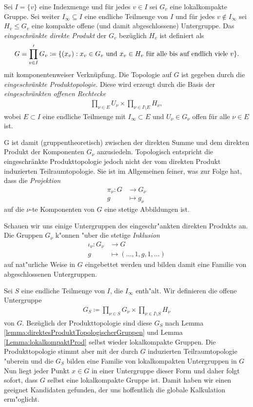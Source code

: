 		\begin{defi}
			Sei $I=\{v\}$ eine Indexmenge und für jedes $v \in I$ sei $G_v$ eine lokalkompakte Gruppe. 
			Sei weiter $I_\infty \subseteq I$ eine endliche Teilmenge von $I$ und für jedes $v \notin I_\infty$ sei $H_v\leq G_v$ eine kompakte offene (und damit abgeschlossene) Untergruppe. 
			Das \emph{eingeschränkte direkte Produkt} der $G_v$ bezüglich $H_v$ ist definiert als 
			\begin{align*}
				G = \prod\limits_{v \in I}' G_v \coloneqq  \{ (x_v): x_v \in G_v \text{ und } x_v \in H_v \text{ für alle bis auf endlich viele } v \}.
			\end{align*}
			mit komponentenweiser Verknüpfung. Die Topologie auf $G$ ist gegeben durch die \emph{eingeschränkte Produktopologie}. 
			Diese wird erzeugt durch die Basis der \emph{eingeschränkten offenen Rechtecke}
			\begin{align*}
				\prod_{\nu\in E} U_\nu \times \prod_{\nu\in I\setminus E} H_\nu,
			\end{align*}
			wobei $E \subset I$ eine endliche Teilmenge mit $I_\infty \subset E$ und $U_\nu \in G_\nu$ offen für alle $\nu\in E$ ist.
		\end{defi}
		G ist damit (gruppentheoretisch) zwischen der direkten Summe und dem direkten Produkt der Komponenten $G_\nu$ anzusiedeln.
		Topologisch entspricht die eingeschränkte Produkttopologie jedoch nicht der vom direkten Produkt induzierten Teilraumtopologie.
		Sie ist im Allgemeinen feiner, was zur Folge hat, dass die \emph{Projektion}
		\begin{align*}
			\pi_\nu: G &\to G_\nu\\
					g&\mapsto g_\nu
		\end{align*}
		auf die $\nu$-te Komponenten von $G$ eine stetige Abbildungen ist.
		
		Schauen wir uns einige Untergruppen des eingeschr"ankten direkten Produkts an.
		Die Gruppen $G_\nu$ k"onnen "uber die stetige \emph{Inklusion} 
		\begin{align*}
			\iota_\nu: G_\nu &\to G \\
					g &\mapsto (\dots,1,g,1,\dots)
		\end{align*}
		auf nat"urliche Weise in $G$ eingebettet werden und bilden damit eine Familie von abgeschlossenen Untergruppen.
		
		Sei $S$ eine endliche Teilmenge von $I$, die $I_\infty$ enth"alt. 
		Wir definieren die offene Untergruppe
		\begin{align*}
			G_S \coloneqq  \prod_{\nu\in S}G_\nu \times \prod_{\nu\in I\setminus S} H_\nu
		\end{align*}
		von $G$. 
		Bezüglich der Produkttopologie sind diese $G_S$ nach Lemma \ref{lemma:direktesProduktTopologischerGruppen} und Lemma \ref{Lemma:lokalkompaktProd} selbst wieder lokalkompakte Gruppen.
		Die Produkttopologie stimmt aber mit der durch $G$ induzierten Teilraumtopologie "uberein und die $G_S$ bilden eine Familie von lokalkompakten Untergruppen in $G$
		Nun liegt jeder Punkt $x \in G$ in einer Untergruppe dieser Form und daher folgt sofort, dass $G$ selbst eine lokalkompakte Gruppe ist.
		Damit haben wir einen geeignet Kandidaten gefunden, der uns hoffentlich die globale Kalkulation erm"oglicht.
		
